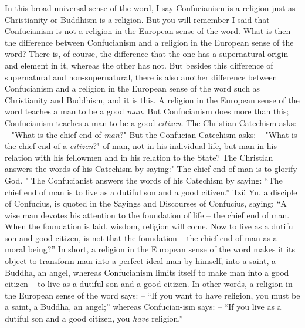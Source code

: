 In this broad universal sense of the word, I say Confucianism is a religion just as Christianity or Buddhism is a religion. But you will remember I said that Confucianism is not a religion in the European sense of the word. What is then the difference between Confucianism and a religion in the European sense of the word? There is, of course, the difference that the one has a supernatural origin and element in it, whereas the other has not. But besides this difference of supernatural and non-supernatural, there is also another difference between Confucianism and a religion in the European sense of the word such as Christianity and Buddhism, and it is this. A religion in the European sense of the word teaches a man to be a good \emph{man}. But Confucianism does more than this; Confucianism teaches a man to be a good \emph{citizen}. The Christian Catechism asks: -- "What is the chief end of \emph{man}?" But the Confucian Catechism asks: -- "What is the chief end of a \emph{citizen}?" of man, not in his individual life, but man in his relation with his fellowmen and in his relation to the State? The Christian answers the words of his Catechism by saying:" The chief end of man is to glorify God. " The Confucianist answers the words of his Catechism by saying: ``The chief end of man is to live as a dutiful son and a good citizen.''
Tz\"u Yu, a disciple of Confucius, is quoted in the Sayings and Discourses of Confucius, saying: ``A wise man devotes his attention to the foundation of life -- the chief end of man. When the foundation is laid, wisdom, religion will come. Now to live as a dutiful son and good citizen, is not that the foundation -- the chief end of man as a moral being?''
In short, a religion in the European sense of the word makes it its object to transform man into a perfect ideal man by himself, into a saint, a Buddha, an angel, whereas Confucianism limits itself to make man into a good citizen --  to live as a dutiful son and a good citizen. In other words, a religion
in the European sense of the word says: -- ``If you want to have religion, you must be a saint, a Buddha, an angel;'' whereas Confucian-ism says: -- ``If you live as a dutiful son and a good citizen, you \emph{have} religion.''


